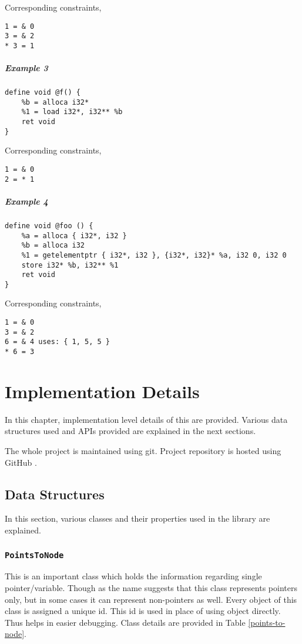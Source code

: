 \documentclass[a4paper,11pt]{report}
\begin{document}
Corresponding constraints,
\begin{lstlisting}
1 = & 0
3 = & 2
* 3 = 1
\end{lstlisting}

\paragraph{Example 3}
\begin{verbatim}
define void @f() {
    %b = alloca i32*
    %1 = load i32*, i32** %b
    ret void
}
\end{verbatim}

Corresponding constraints,
\begin{lstlisting}
1 = & 0
2 = * 1
\end{lstlisting}

\paragraph{Example 4}

\begin{verbatim}
define void @foo () {
    %a = alloca { i32*, i32 }
    %b = alloca i32
    %1 = getelementptr { i32*, i32 }, {i32*, i32}* %a, i32 0, i32 0
    store i32* %b, i32** %1
    ret void
}
\end{verbatim}

Corresponding constraints,
\begin{lstlisting}
1 = & 0
3 = & 2
6 = & 4 uses: { 1, 5, 5 }
* 6 = 3
\end{lstlisting}

\chapter{Implementation Details}
In this chapter, implementation level details of this are provided. Various 
data structures used and APIs provided are explained in the next sections.

The whole project is maintained using git. Project repository is hosted using
GitHub \cite{GitHub}.

\section{Data Structures}
In this section, various classes and their properties used in the library are 
explained.

\subsection{\texttt{PointsToNode}}
This is an important class which holds the information regarding single 
pointer/variable. Though as the name suggests that this class represents 
pointers only, but in some cases it can represent non-pointers as well.
Every object of this class is assigned a unique id. This id is used in place 
of using object directly. Thus helps in easier debugging. Class details are provided in Table \ref{points-to-node}.
\end{document}

